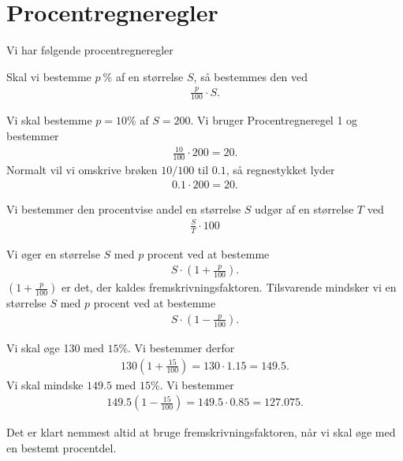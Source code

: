 \section*{Procentregneregler}
Vi har følgende procentregneregler
\begin{regel}[Procentregneregel 1]
Skal vi bestemme $p\ \%$ af en størrelse $S$, så bestemmes den ved 
\begin{align*}
\frac{p}{100}\cdot S.
\end{align*} 
\end{regel}
\begin{exa}
Vi skal bestemme $p=10\%$ af $S=200$. Vi bruger Procentregneregel 1 og bestemmer
\begin{align*}
\frac{10}{100}\cdot 200 = 20. 
\end{align*} 
Normalt vil vi omskrive brøken $10/100$ til $0.1$, så regnestykket lyder
\begin{align*}
0.1\cdot 200 = 20.
\end{align*} 
\end{exa}
\begin{regel}[Procentregneregel 2]
Vi bestemmer den procentvise andel en størrelse $S$ udgør af en størrelse $T$ ved 
\begin{align*}
\frac{S}{T}\cdot 100
\end{align*}
\end{regel}
\begin{regel}[Procentregneregel 3]
Vi øger en størrelse $S$ med $p$ procent ved at bestemme
\begin{align*}
S\cdot(1+\frac{p}{100}). 
\end{align*}
$(1+\frac{p}{100})$ er det, der kaldes fremskrivningsfaktoren. 
Tilsvarende mindsker vi en størrelse $S$ med $p$ procent ved at bestemme
\begin{align*}
S \cdot (1-\frac{p}{100}).
\end{align*}
\end{regel}
\begin{exa}
Vi skal øge 130 med $15 \%$. Vi bestemmer derfor 
\begin{align*}
130 (1+\frac{15}{100}) = 130\cdot 1.15 = 149.5.
\end{align*}
Vi skal mindske $149.5$ med $15 \%$. Vi bestemmer
\begin{align*}
149.5(1-\frac{15}{100}) = 149.5\cdot 0.85 = 127.075.
\end{align*}
\end{exa}
Det er klart nemmest altid at bruge fremskrivningsfaktoren, når vi skal øge med en bestemt procentdel. 

